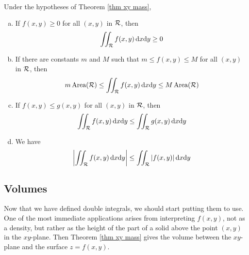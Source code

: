 \begin{theorem}\label{thm:INT2dineq}
Under the hypotheses of Theorem \ref{thm xy mass},
\begin{enumerate}[(a)]
\item 
If $f(x,y)\ge 0$ for all $(x,y)$ in $\mathcal{R}$, then
\begin{align*}
\iint_{\mathcal{R}} f(x,y)\,\mathrm{d}x\mathrm{d}y \ge 0
\end{align*}
\item 
If there are constants $m$ and $M$ such that  $m\le f(x,y)\le M$ 
for all $(x,y)$ in $\mathcal{R}$, then
\begin{align*}
m\,\text{Area}(\mathcal{R})\le \iint_{\mathcal{R}} f(x,y)\,\mathrm{d}x\mathrm{d}y 
                                   \le M\,\text{Area}(\mathcal{R})
\end{align*}
\item If $f(x,y)\le g(x,y)$ for all $(x,y)$ in $\mathcal{R}$, then
\begin{align*}
\iint_{\mathcal{R}} f(x,y)\,\mathrm{d}x\mathrm{d}y \le \iint_{\mathcal{R}} g(x,y)\,\mathrm{d}x\mathrm{d}y
\end{align*}
\item We have
\begin{align*}
\left|\iint_{\mathcal{R}} f(x,y)\,\mathrm{d}x\mathrm{d}y\right|
          \le \iint_{\mathcal{R}} |f(x,y)|\,\mathrm{d}x\mathrm{d}y
\end{align*}
\end{enumerate}
\end{theorem}




\subsection{Volumes}

Now that we have defined double integrals, we should start putting them to use.
One of the most immediate applications arises from interpreting $f(x,y)$,
not as a density, but rather as the height of the part of a solid above the 
point $(x,y)$ in the $xy$-plane. Then Theorem \ref{thm xy mass} gives 
the volume between the $xy$-plane and the surface $z=f(x,y)$. 

